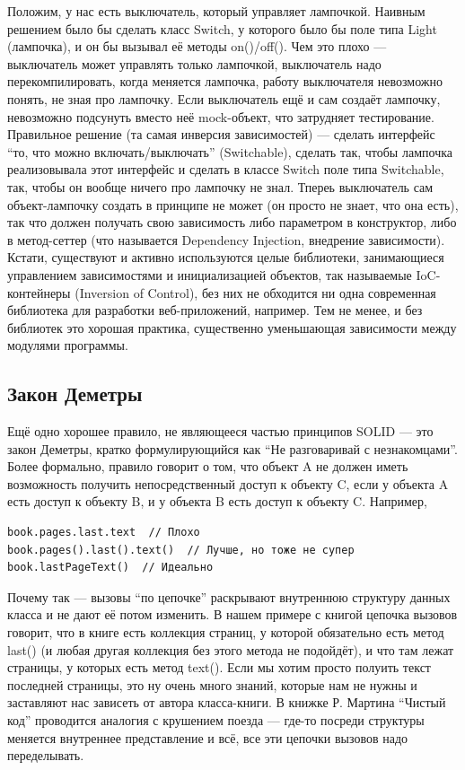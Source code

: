 \documentclass[a5paper]{article}
\begin{document}
\begin{itemize}
		Положим, у нас есть выключатель, который управляет лампочкой. Наивным решением было бы сделать класс Switch, у которого было бы поле типа Light (лампочка), и он бы вызывал её методы on()/off(). Чем это плохо --- выключатель может управлять только лампочкой, выключатель надо перекомпилировать, когда меняется лампочка, работу выключателя невозможно понять, не зная про лампочку. Если выключатель ещё и сам создаёт лампочку, невозможно подсунуть вместо неё mock-объект, что затрудняет тестирование. Правильное решение (та самая инверсия зависимостей) --- сделать интерфейс ``то, что можно включать/выключать'' (Switchable), сделать так, чтобы лампочка реализовывала этот интерфейс и сделать в классе Switch поле типа Switchable, так, чтобы он вообще ничего про лампочку не знал. Тпереь выключатель сам объект-лампочку создать в принципе не может (он просто не знает, что она есть), так что должен получать свою зависимость либо параметром в конструктор, либо в метод-сеттер (что называется Dependency Injection, внедрение зависимости). Кстати, существуют и активно используются целые библиотеки, занимающиеся управлением зависимостями и инициализацией объектов, так называемые IoC-контейнеры (Inversion of Control), без них не обходится ни одна современная библиотека для разработки веб-приложений, например. Тем не менее, и без библиотек это хорошая практика, существенно уменьшающая зависимости между модулями программы.
\end{itemize}

\subsection{Закон Деметры}

Ещё одно хорошее правило, не являющееся частью принципов SOLID --- это закон Деметры, кратко формулирующийся как ``Не разговаривай с незнакомцами''. Более формально, правило говорит о том, что объект A не должен иметь возможность получить непосредственный доступ к объекту C, если у объекта A есть доступ к объекту B, и у объекта B есть доступ к объекту C. Например,

\begin{verbatim}
book.pages.last.text  // Плохо
book.pages().last().text()  // Лучше, но тоже не супер
book.lastPageText()  // Идеально
\end{verbatim}

Почему так --- вызовы ``по цепочке'' раскрывают внутреннюю структуру данных класса и не дают её потом изменить. В нашем примере с книгой цепочка вызовов говорит, что в книге есть коллекция страниц, у которой обязательно есть метод last() (и любая другая коллекция без этого метода не подойдёт), и что там лежат страницы, у которых есть метод text(). Если мы хотим просто полуить текст последней страницы, это ну очень много знаний, которые нам не нужны и заставляют нас зависеть от автора класса-книги. В книжке Р. Мартина ``Чистый код'' проводится аналогия с крушением поезда --- где-то посреди структуры меняется внутреннее представление и всё, все эти цепочки вызовов надо переделывать.
\end{document}
